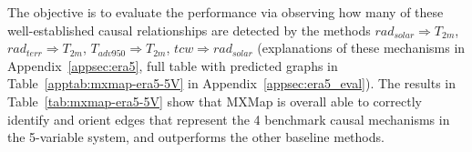 \begin{table}[htb]
\centering
{}
\caption{Detection of Benchmark Causal Relationships in the ERA5 5V System (full visualizations in Table~\ref{apptab:mxmap-era5-5V}). A checkmark (green) indicates a correctly detected and oriented edge, a half-checkmark (gray) denotes a detected but ambiguously oriented edge, and a crossmark (red) represents an undetected or incorrectly oriented edge.}
\label{tab:mxmap-era5-5V}
\end{table}

The objective is to evaluate the performance via observing how many of these well-established causal relationships are detected by the methods $rad_{solar} \Rightarrow T_{2m}$, $rad_{terr} \Rightarrow T_{2m}$, $T_{adv950} \Rightarrow T_{2m}$, $tcw\Rightarrow rad_{solar}$ (explanations of these mechanisms in Appendix~\ref{appsec:era5}, full table with predicted graphs in Table~\ref{apptab:mxmap-era5-5V} in Appendix~\ref{appsec:era5_eval}). The results in Table~\ref{tab:mxmap-era5-5V} show that MXMap is overall able to correctly identify and orient edges that represent the 4 benchmark causal mechanisms in the 5-variable system, and outperforms the other baseline methods.